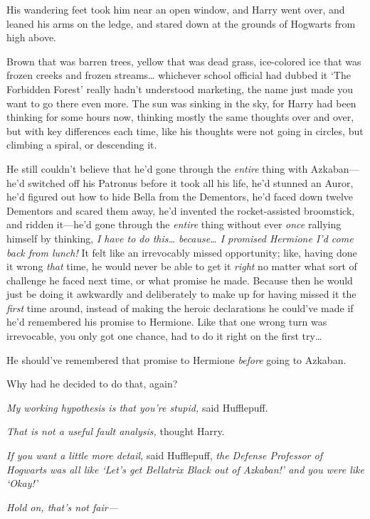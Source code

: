 His wandering feet took him near an open window, and Harry went over, and leaned his arms on the ledge, and stared down at the grounds of Hogwarts from high above.

Brown that was barren trees, yellow that was dead grass, ice-colored ice that was frozen creeks and frozen streams{\ldots} whichever school official had dubbed it `The Forbidden Forest' really hadn't understood marketing, the name just made you want to go there even more. The sun was sinking in the sky, for Harry had been thinking for some hours now, thinking mostly the same thoughts over and over, but with key differences each time, like his thoughts were not going in circles, but climbing a spiral, or descending it.

He still couldn't believe that he'd gone through the \emph{entire} thing with Azkaban—he'd switched off his Patronus before it took all his life, he'd stunned an Auror, he'd figured out how to hide Bella from the Dementors, he'd faced down twelve Dementors and scared them away, he'd invented the rocket-assisted broomstick, and ridden it—he'd gone through the \emph{entire} thing without ever \emph{once} rallying himself by thinking, \emph{I have to do this{\ldots} because{\ldots} I promised Hermione I'd come back from lunch!} It felt like an irrevocably missed opportunity; like, having done it wrong \emph{that} time, he would never be able to get it \emph{right} no matter what sort of challenge he faced next time, or what promise he made. Because then he would just be doing it awkwardly and deliberately to make up for having missed it the \emph{first} time around, instead of making the heroic declarations he could've made if he'd remembered his promise to Hermione. Like that one wrong turn was irrevocable, you only got one chance, had to do it right on the first try{\ldots}

He should've remembered that promise to Hermione \emph{before} going to Azkaban.

Why had he decided to do that, again?

\emph{My working hypothesis is that you're stupid,} said Hufflepuff.

\emph{That is not a useful fault analysis,} thought Harry.

\emph{If you want a little more detail,} said Hufflepuff, \emph{the Defense Professor of Hogwarts was all like `Let's get Bellatrix Black out of Azkaban!' and you were like `Okay!'}

\emph{Hold on, \emph{that's} not fair—}

